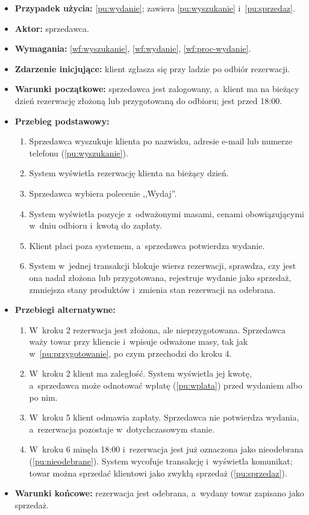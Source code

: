 \documentclass[12pt,a4paper,oneside]{article}
\newcounter{pu}
\begin{document}
\begin{itemize}
	\item \textbf{Przypadek użycia:} \ref{pu:wydanie}; zawiera \ref{pu:wyszukanie} i~\ref{pu:sprzedaz}.
	\item \textbf{Aktor:} sprzedawca.
	\item \textbf{Wymagania:} \ref{wf:wyszukanie}, \ref{wf:wydanie}, \ref{wf:proc-wydanie}.
	\item \textbf{Zdarzenie inicjujące:} klient zgłasza się przy ladzie po odbiór rezerwacji.
	\item \textbf{Warunki początkowe:} sprzedawca jest zalogowany, a~klient ma na bieżący dzień rezerwację złożoną lub przygotowaną do odbioru; jest przed 18:00.
	\item \textbf{Przebieg podstawowy:}
	\begin{enumerate}
		\item Sprzedawca wyszukuje klienta po nazwisku, adresie e-mail lub numerze telefonu (\ref{pu:wyszukanie}).
		\item System wyświetla rezerwację klienta na bieżący dzień.
		\item Sprzedawca wybiera polecenie ,,Wydaj''.
		\item System wyświetla pozycje z~odważonymi masami, cenami obowiązującymi w~dniu odbioru i~kwotą do zapłaty.
		\item Klient płaci poza systemem, a~sprzedawca potwierdza wydanie.
		\item System w~jednej transakcji blokuje wiersz rezerwacji, sprawdza, czy jest ona nadal złożona lub przygotowana, rejestruje wydanie jako sprzedaż, zmniejsza stany produktów i~zmienia stan rezerwacji na odebrana.
	\end{enumerate}
	\item \textbf{Przebiegi alternatywne:}
	\begin{enumerate}[label=A\arabic*.]
		\item W~kroku 2 rezerwacja jest złożona, ale nieprzygotowana. Sprzedawca waży towar przy kliencie i~wpisuje odważone masy, tak jak w~\ref{pu:przygotowanie}, po czym przechodzi do kroku 4.
		\item W~kroku 2 klient ma zaległość. System wyświetla jej kwotę, a~sprzedawca może odnotować wpłatę (\ref{pu:wplata}) przed wydaniem albo po nim.
		\item W~kroku 5 klient odmawia zapłaty. Sprzedawca nie potwierdza wydania, a~rezerwacja pozostaje w~dotychczasowym stanie.
		\item W~kroku 6 minęła 18:00 i~rezerwacja jest już oznaczona jako nieodebrana (\ref{pu:nieodebrane}). System wycofuje transakcję i~wyświetla komunikat; towar można sprzedać klientowi jako zwykłą sprzedaż (\ref{pu:sprzedaz}).
	\end{enumerate}
	\item \textbf{Warunki końcowe:} rezerwacja jest odebrana, a~wydany towar zapisano jako sprzedaż.
\end{itemize}
\end{document}
